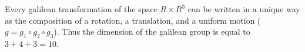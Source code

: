 Every galilean transformation of the space $R \times R^3$ can be written in a unique way as the composition of a rotation, a translation, and a uniform motion ($g = g_1 \circ g_2 \circ g_3$). Thus the dimension of the galilean group is equal to $3 + 4 + 3 = 10$.
